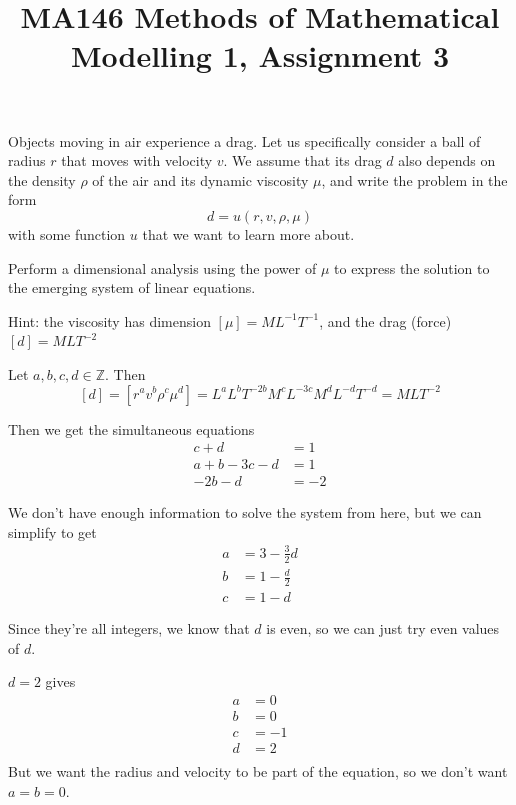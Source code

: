 \documentclass[a4paper]{article}
\title{MA146 Methods of Mathematical Modelling 1, Assignment 3}
\begin{document}
\maketitle

\setlength{\parindent}{0em}
\setlength{\parskip}{1em}


\begin{questionbody}
Objects moving in air experience a drag. Let us specifically consider a ball of radius $r$ that moves with velocity $v$. We assume that its drag $d$ also depends on the density $\rho$ of the air and its dynamic viscosity $\mu$, and write the problem in the form \[
d = u(r, v, \rho, \mu)
\] with some function $u$ that we want to learn more about.

Perform a dimensional analysis using the power of $\mu$ to express the solution to the emerging system of linear equations.

Hint: the viscosity has dimension $[\mu] = M L^{-1} T^{-1}$, and the drag (force) $[d] = M L T^{-2}$
\end{questionbody}

Let $a, b, c, d \in \mathbb Z$. Then $$[d] = \left[ r^a v^b \rho^c \mu^d \right] = L^a L^b T^{-2b} M^c L^{-3c} M^d L^{-d} T^{-d} = MLT^{-2}$$

Then we get the simultaneous equations \begin{align*}
	c + d &= 1\\
	a + b - 3c - d &= 1\\
	-2b - d &= -2
\end{align*}

We don't have enough information to solve the system from here, but we can simplify to get \begin{align*}
	a &= 3 - \frac32 d\\
	b &= 1 - \frac d2\\
	c &= 1 - d
\end{align*}

Since they're all integers, we know that $d$ is even, so we can just try even values of $d$.

$d=2$ gives \begin{align*}
	a &= 0\\
	b &= 0\\
	c &= -1\\
	d &= 2\\
\end{align*}
But we want the radius and velocity to be part of the equation, so we don't want $a=b=0$.
\end{document}
